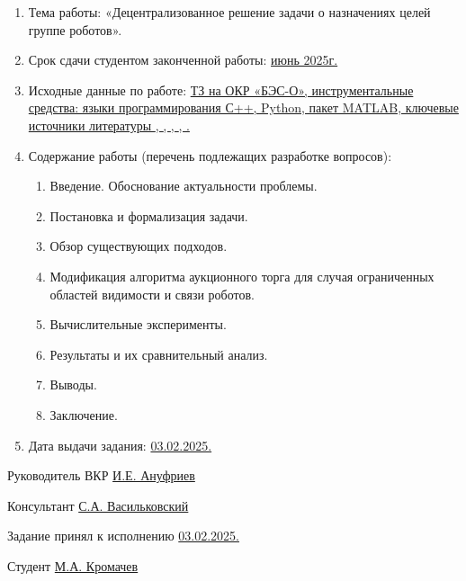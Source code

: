 \begin{enumerate}[1.]
	\item Тема работы: {\expandafter \ulined «Децентрализованное решение задачи о назначениях целей группе роботов».}
	\item Срок сдачи студентом законченной работы: \uline{июнь 2025г.} 
	\item Исходные данные по работе: \uline{ТЗ на ОКР «БЭС-О», инструментальные средства: языки программирования С++, Python, пакет MATLAB, ключевые источники литературы \cite{bertsekas1990}, \cite{kuhn1955}, \cite{kalyaev2009}, \cite{gerkey2003}, \cite{pshikhopov2015}.}%
	\printbibliographyTask %
	\item Содержание работы (перечень подлежащих разработке вопросов):
	\begin{enumerate}[label=\theenumi\arabic*.]
		\item Введение. Обоснование актуальности проблемы.
		\item Постановка и формализация задачи.
		\item Обзор существующих подходов.
		\item Модификация алгоритма аукционного торга для случая ограниченных областей видимости и связи роботов. 
		\item Вычислительные эксперименты. 
		\item Результаты и их сравнительный анализ. 
		\item Выводы. 
		\item Заключение. 
	\end{enumerate}	
		\item Дата выдачи задания: \uline{03.02.2025.}
\end{enumerate}

\intervalS%

Руководитель ВКР \uline{\hspace*{0.1\textheight} И.Е. Ануфриев}


\intervalS%

Консультант \uline{\hspace*{0.1\textheight}С.А. Васильковский}


\intervalS%


Задание принял к исполнению \uline{03.02.2025.}

\intervalS%

Студент \uline{\hspace*{0.1\textheight}  М.А. Кромачев}



